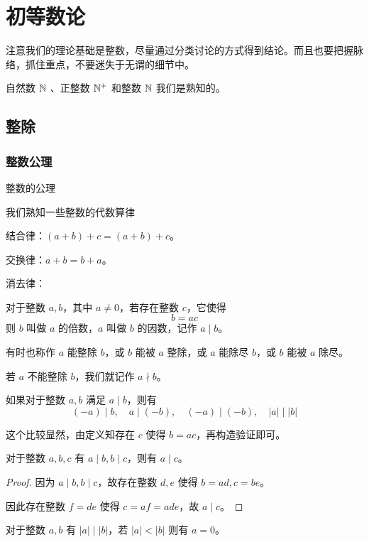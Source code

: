 \chapter{初等数论}

注意我们的理论基础是整数，尽量通过分类讨论的方式得到结论。而且也要把握脉络，抓住重点，不要迷失于无谓的细节中。

自然数 $\mathbb{N}$ 、正整数 $\mathbb{N}^+$ 和整数 $\mathbb{N}$ 我们是熟知的。

\section{整除}

\subsection{整数公理}

整数的公理

我们熟知一些整数的代数算律

结合律：$(a+b)+c = (a+b)+c$。

交换律：$a+b = b+a$。

消去律：

\begin{definition}
	对于整数 $a,b$，其中 $a\ne 0$，若存在整数 $c$，它使得
	$$b=ac$$
	则 $b$ 叫做 $a$ 的倍数，$a$ 叫做 $b$ 的因数，记作 $a \mid b$。
\end{definition}

有时也称作 $a$ 能整除 $b$，或 $b$ 能被 $a$ 整除，或 $a$ 能除尽 $b$，或 $b$ 能被 $a$ 除尽。

若 $a$ 不能整除 $b$，我们就记作 $a \nmid b$。

\begin{lemma}
	如果对于整数 $a,b$ 满足 $a \mid b$，则有
	$$(-a) \mid b,\quad a \mid (-b),\quad (-a) \mid (-b),\quad |a| \mid |b|$$
\end{lemma}

这个比较显然，由定义知存在 $c$ 使得 $b=ac$，再构造验证即可。

\begin{lemma}
	对于整数 $a,b,c$ 有 $a \mid b,b \mid c$，则有 $a \mid c$。
\end{lemma}

\begin{proof}
	因为 $a \mid b,b \mid c$，故存在整数 $d,e$ 使得 $b=ad,c=be$。

	因此存在整数 $f=de$ 使得 $c=af=ade$，故 $a \mid c$。
\end{proof}

\begin{lemma}
	对于整数 $a,b$ 有 $|a| \mid |b|$，若 $|a|<|b|$ 则有 $a=0$。
\end{lemma}

